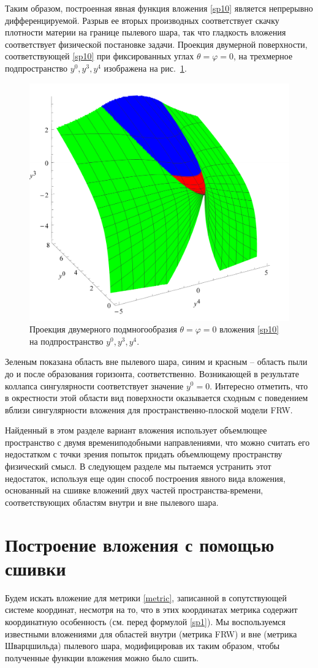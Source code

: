 \documentclass[12pt]{article}
\begin{document}
Таким образом, построенная явная функция вложения \eqref{sp10} является непрерывно дифференцируемой.
Разрыв ее вторых производных соответствует скачку плотности материи на границе пылевого шара, так что гладкость вложения
соответствует физической постановке задачи. Проекция двумерной поверхности, соответствующей \eqref{sp10}
при фиксированных углах $\theta=\varphi=0$, на трехмерное подпространство $y^0,y^3,y^4$ изображена
на рис.~\ref{pic_emb1}.
\begin{figure}[h!]
\centering
\includegraphics[width=0.55\linewidth]{col_emb-c2.pdf}
\caption{\label{pic_emb1}
Проекция двумерного подмногообразия $\theta=\varphi=0$ вложения \eqref{sp10} на подпространство $y^0,y^3,y^4$.
}
\end{figure}
Зеленым показана область вне пылевого шара, синим и красным -- область пыли до и после образования горизонта, соответственно.
Возникающей в результате коллапса сингулярности соответствует значение $y^0=0$. Интересно отметить, что
в окрестности этой области вид поверхности оказывается сходным с поведением вблизи сингулярности
вложения \cite{robertson1933} для пространственно-плоской модели FRW.

Найденный в этом разделе вариант вложения использует объемлющее пространство с двумя времениподобными направлениями,
что можно считать его недостатком с точки зрения попыток придать объемлющему пространству физический смысл.
В следующем разделе мы пытаемся устранить этот недостаток, используя еще один способ построения явного вида вложения,
основанный на сшивке вложений двух частей пространства-времени, соответствующих областям внутри и вне пылевого шара.


\section{Построение вложения с помощью сшивки}
Будем искать вложение для метрики \eqref{metric}, записанной в сопутствующей системе координат, несмотря на то, что
в этих координатах метрика содержит координатную особенность (см. перед формулой \eqref{sp1}).
Мы воспользуемся известными вложениями для областей внутри (метрика FRW) и вне  (метрика Шварцшильда)
пылевого шара, модифицировав их таким образом, чтобы полученные функции вложения можно было сшить.
\end{document}
